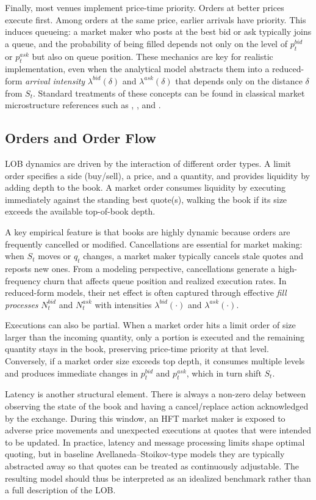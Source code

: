 Finally, most venues implement price-time priority. Orders at better prices execute first. Among orders at the same price, earlier arrivals have priority. This induces queueing: a market maker who posts at the best bid or ask typically joins a queue, and the probability of being filled depends not only on the level of $p_t^{bid}$ or $p_t^{ask}$ but also on queue position. These mechanics are key for realistic implementation, even when the analytical model abstracts them into a reduced-form \emph{arrival intensity} $\lambda^{bid}(\delta)$ and $\lambda^{ask}(\delta)$ that depends only on the distance $\delta$ from $S_t$. Standard treatments of these concepts can be found in classical market microstructure references such as \textcite{OHara1995}, \textcite{Harris2003}, and \textcite{Hasbrouck2007}.

\subsection{Orders and Order Flow}
LOB dynamics are driven by the interaction of different order types. A limit order specifies a side (buy/sell), a price, and a quantity, and provides liquidity by adding depth to the book. A market order consumes liquidity by executing immediately against the standing best quote(s), walking the book if its size exceeds the available top-of-book depth.

A key empirical feature is that books are highly dynamic because orders are frequently cancelled or modified. Cancellations are essential for market making: when $S_t$ moves or $q_t$ changes, a market maker typically cancels stale quotes and reposts new ones. From a modeling perspective, cancellations generate a high-frequency churn that affects queue position and realized execution rates. In reduced-form models, their net effect is often captured through effective \emph{fill processes} $N_t^{bid}$ and $N_t^{ask}$ with intensities $\lambda^{bid}(\cdot)$ and $\lambda^{ask}(\cdot)$.

Executions can also be partial. When a market order hits a limit order of size larger than the incoming quantity, only a portion is executed and the remaining quantity stays in the book, preserving price-time priority at that level. Conversely, if a market order size exceeds top depth, it consumes multiple levels and produces immediate changes in $p_t^{bid}$ and $p_t^{ask}$, which in turn shift $S_t$.

Latency is another structural element. There is always a non-zero delay between observing the state of the book and having a cancel/replace action acknowledged by the exchange. During this window, an HFT market maker is exposed to adverse price movements and unexpected executions at quotes that were intended to be updated. In practice, latency and message processing limits shape optimal quoting, but in baseline Avellaneda--Stoikov-type models they are typically abstracted away so that quotes can be treated as continuously adjustable. The resulting model should thus be interpreted as an idealized benchmark rather than a full description of the LOB.

